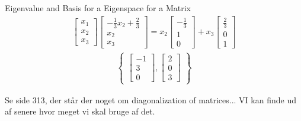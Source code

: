 \begin{example}{Eigenvalue and Basis for a Eigenspace for a Matrix}
\begin{align*}
    \begin{bmatrix}
        x_1\\x_2\\x_3
    \end{bmatrix}
    \begin{bmatrix}
        -\frac{1}{3}x_2+\frac{2}{3}\\x_2\\x_3
    \end{bmatrix}=x_2
    \begin{bmatrix}
        -\frac{1}{3}\\1\\0
    \end{bmatrix}+x_3
    \begin{bmatrix}
        \frac{2}{3}\\0\\1
    \end{bmatrix}
\end{align*}
\begin{align*}
    \begin{Bmatrix}
    \begin{bmatrix}
        -1\\3\\0
    \end{bmatrix},
    \begin{bmatrix}
        2\\0\\3
    \end{bmatrix}
    \end{Bmatrix}
\end{align*}
\end{example}

Se side 313, der står der noget om diagonalization of matrices... VI kan finde ud af senere hvor meget vi skal bruge af det. 

